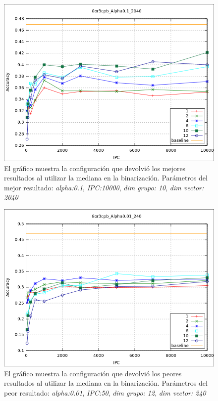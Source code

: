 			\begin{figure}[htbp]
				\centering
				\includegraphics[scale=0.6]{img/resultados/sinteticas/best_median_8or3cpb_Alpha0,1_2040.png}
				\caption[Sintéticas mediana mejor resultado]{El gráfico muestra la configuración que devolvió los mejores resultados al utilizar la mediana en la binarización. Parámetros del mejor resultado: \textit{alpha:0.1}, \textit{IPC:10000}, \textit{dim grupo: 10}, \textit{dim vector: 2040}}
				\label{fig: Sinteticas-median-mejor}
			\end{figure}
	
			\begin{figure}[htbp]
				\centering
				\includegraphics[scale=0.6]{img/resultados/sinteticas/worst_median_8or3cpb_Alpha0,01_240.png}
				\caption[Sintéticas mediana peor resultado]{El gráfico muestra la configuración que devolvió los peores resultados al utilizar la mediana en la binarización. Parámetros del peor resultado: \textit{alpha:0.01}, \textit{IPC:50}, \textit{dim grupo: 12}, \textit{dim vector: 240}}
				\label{fig: Sinteticas-median-bajo}
			\end{figure}
				
